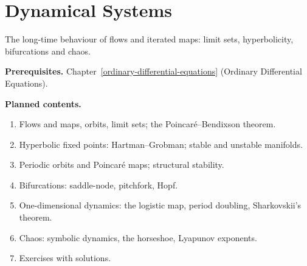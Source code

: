 \chapter{Dynamical Systems}\label{dynamical-systems}

The long-time behaviour of flows and iterated maps: limit sets, hyperbolicity, bifurcations and chaos.

\noindent\textbf{Prerequisites.} Chapter~\ref{ordinary-differential-equations} (Ordinary Differential Equations).

\noindent\textbf{Planned contents.}
\begin{enumerate}
\item Flows and maps, orbits, limit sets; the Poincar\'e--Bendixson theorem.
\item Hyperbolic fixed points: Hartman--Grobman; stable and unstable manifolds.
\item Periodic orbits and Poincar\'e maps; structural stability.
\item Bifurcations: saddle-node, pitchfork, Hopf.
\item One-dimensional dynamics: the logistic map, period doubling, Sharkovskii's theorem.
\item Chaos: symbolic dynamics, the horseshoe, Lyapunov exponents.
\item Exercises with solutions.
\end{enumerate}
